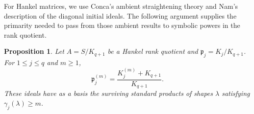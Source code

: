 \documentclass[11pt,reqno]{amsart}
\numberwithin{equation}{subsection}
\newtheorem{proposition}[theorem]{Proposition}
\theoremstyle{definition}
\theoremstyle{remark}
\newcommand{\fp}{\mathfrak p}
\begin{document}
For Hankel matrices, we use Conca's ambient straightening
theory \cite{ConcaHankel} and Nam's description \cite{Nam} of the diagonal initial ideals.
The following argument supplies the primarity needed to
pass from those ambient results to symbolic powers in the
rank quotient.

\begin{proposition}
\label{prop:hankel-descent}
Let $A=S/K_{q+1}$ be a Hankel rank quotient and
$\fp_j=K_j/K_{q+1}$. For $1\le j\le q$ and $m\ge1$,
\begin{equation}\label{eq:hankel-symbolic-descent}
 \fp_j^{(m)}
 =\frac{K_j^{(m)}+K_{q+1}}{K_{q+1}}.
\end{equation}
These ideals have as a basis the surviving standard products
of shapes $\lambda$ satisfying $\gamma_j(\lambda)\ge m$.
\end{proposition}
\end{document}
